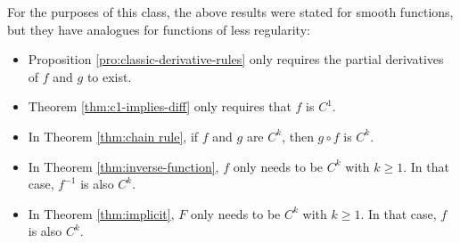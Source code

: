 \documentclass{ximera}
\begin{document}
\begin{remark}
    For the purposes of this class, the above results were stated for smooth functions, but they have analogues for functions of less regularity:
    \begin{itemize}
        \item Proposition \ref{pro:classic-derivative-rules} only requires the partial derivatives of $f$ and $g$ to exist.
        \item Theorem \ref{thm:c1-implies-diff} only requires that $f$ is $C^1$.
        \item In Theorem \ref{thm:chain rule}, if  $f$ and  $g$  are $C^k$, then $g \circ f$ is $C^k$.
        \item  In Theorem \ref{thm:inverse-function}, $f$ only needs to be $C^k$ with $k \geq 1$. In that case,  $f^{-1}$ is also $C^k$.
        \item In Theorem \ref{thm:implicit}, $F$ only needs to be $C^k$ with $k \geq 1$. In that case, $f$ is also $C^k$.
    \end{itemize}
\end{remark}
\end{document}
